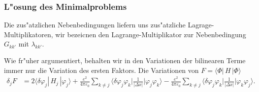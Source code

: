 \subsubsection{L"osung des Minimalproblems}
Die zus"atzlichen Nebenbedingungen liefern uns zus"atzliche
Lagrage-Multiplikatoren, wir bezeicnen den Lagrange-Multiplikator
zur Nebenbedingung $G_{kk'}$ mit $\lambda_{kk'}$.

Wie fr"uher argumentiert, behalten wir in den Variationen der
bilinearen Terme immer nur die Variation des ersten Faktors.
Die Variationen von $F=\langle\Phi|\,H\,|\Phi\rangle$
\begin{align*}
\delta_j F
&=
2\langle\delta\varphi_j|\,H_j\,|\varphi_j\rangle
+
\frac{e^2}{4\pi\varepsilon_0}
\sum_{k\ne j}
\biggl\langle\delta\varphi_j\varphi_k\biggr|
\frac{1}{|\Delta x|}
\biggl|\varphi_j \varphi_k\biggr\rangle
-
\frac{e^2}{4\pi\varepsilon_0}
\sum_{k\ne j}
\biggl\langle\delta\varphi_j\varphi_k\biggr|
\frac{1}{|\Delta x|}
\biggl|\varphi_k \varphi_j\biggr\rangle.
\end{align*}

